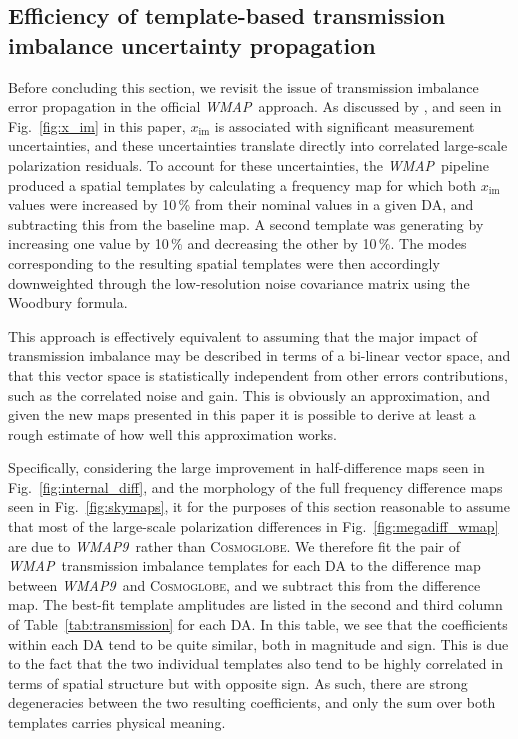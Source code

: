 \documentclass[twocolumn]{../../common/aa}
\def\WMAP{\emph{WMAP}}
\def\WMAPnine{\emph{WMAP9}}
\newcommand{\cosmoglobe}{\textsc{Cosmoglobe}}
\begin{document}
\subsection{Efficiency of template-based transmission imbalance uncertainty propagation}
\label{subsec:imbalance_template}




Before concluding this section, we revisit the issue of transmission imbalance error propagation in the official \WMAP\ approach. As discussed by \citet{jarosik2007}, and seen in Fig.~\ref{fig:x_im} in this paper, $x_{\mathrm{im}}$ is associated with significant measurement uncertainties, and these uncertainties translate directly into correlated large-scale polarization residuals. To account for these uncertainties, the \WMAP\ pipeline produced a spatial templates by calculating a frequency map for which both $x_{\textrm{im}}$ values were increased by 10\,\% from their nominal values in a given DA, and subtracting this from the baseline map. A second template was generating by increasing one value by 10\,\% and decreasing the other by 10\,\%. The modes corresponding to the resulting spatial templates were then accordingly downweighted through the low-resolution noise covariance matrix using the Woodbury formula.

This approach is effectively equivalent to assuming that the major impact of transmission imbalance may be described in terms of a bi-linear vector space, and that this vector space is statistically independent from other errors contributions, such as the correlated noise and gain. This is obviously an approximation, and given the new maps presented in this paper it is possible to derive at least a rough estimate of how well this approximation works.

Specifically, considering the large improvement in half-difference maps seen in Fig.~\ref{fig:internal_diff}, and the morphology of the full frequency difference maps seen in Fig.~\ref{fig:skymaps}, it for the purposes of this section reasonable to assume that most of the large-scale polarization differences in Fig.~\ref{fig:megadiff_wmap} are due to \WMAPnine\ rather than \cosmoglobe. We therefore fit the pair of \WMAP\ transmission imbalance templates for each DA to the difference map between \WMAPnine\ and \cosmoglobe, and we subtract this from the difference map. The best-fit template amplitudes are listed in the second and third column of Table~\ref{tab:transmission} for each DA. In this table, we see that the coefficients within each DA tend to be quite similar, both in magnitude and sign. This is due to the fact that the two individual templates also tend to be highly correlated in terms of spatial structure but with opposite sign. As such, there are strong degeneracies between the two resulting coefficients, and only the sum over both templates carries physical meaning. 
\end{document}
